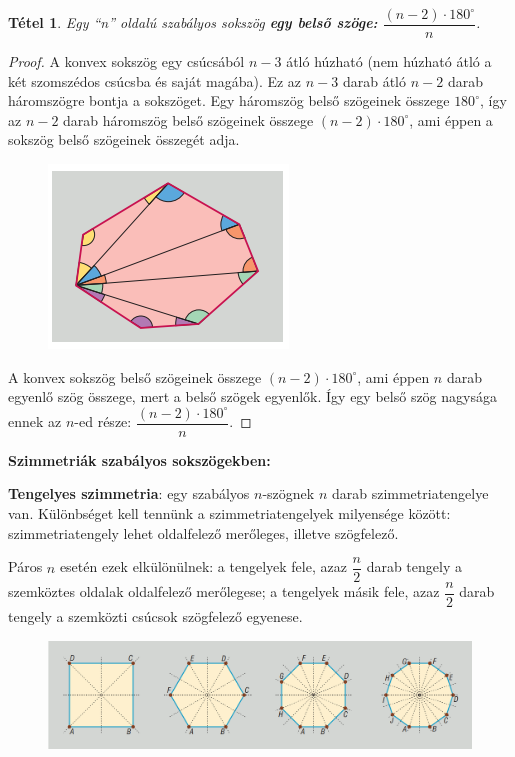 \documentclass[12pt,a4paper]{article}
\newtheorem{theorem}{Tétel} [section]
\begin{document}
\begin{theorem}
Egy ``n'' oldalú szabályos sokszög \textbf{egy belső szöge:} $\dfrac{(n-2)\cdot 180^\circ}{n}$.
\end{theorem}

\begin{proof}
A konvex sokszög egy csúcsából $n - 3$ átló húzható (nem húzható átló a két szomszédos csúcsba és saját magába). Ez az $n - 3$ darab átló $n - 2$ darab háromszögre bontja a sokszöget. Egy háromszög belső szögeinek összege $180^\circ$, így az $n - 2$ darab háromszög belső szögeinek összege $(n - 2) \cdot 180^\circ$, ami éppen a sokszög belső szögeinek összegét adja.
\begin{figure}[h]
\centering
\includegraphics[scale=0.3]{szab_sokszog}
\end{figure}

A konvex sokszög belső szögeinek összege $(n - 2) \cdot 180^\circ$, ami éppen $n$ darab egyenlő szög összege, mert a belső szögek egyenlők. Így egy belső szög nagysága ennek az $n$-ed része: $\dfrac{(n-2)\cdot 180^\circ}{n}$.

\end{proof}

\newpage
\textbf{Szimmetriák szabályos sokszögekben:}

\textbf{Tengelyes szimmetria}: egy szabályos $n$-szögnek $n$ darab szimmetriatengelye van. Különbséget kell tennünk a szimmetriatengelyek milyensége között: szimmetriatengely lehet oldalfelező merőleges, illetve szögfelező.

Páros $n$ esetén ezek elkülönülnek: a tengelyek fele, azaz $\dfrac{n}{2}$ darab tengely a szemköztes oldalak oldalfelező merőlegese; a tengelyek másik fele, azaz $\dfrac{n}{2}$ darab tengely a szemközti csúcsok szögfelező egyenese.

\begin{figure}[h]
\centering
\includegraphics[scale=0.3]{geometry/szimmetria1}
\end{figure}
\end{document}
